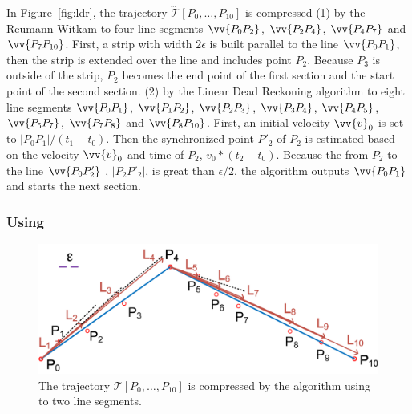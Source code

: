 {\begin{example}
\label{exm-alg-strip}
In Figure~\ref{fig:ldr}, the trajectory $\dddot{\mathcal{T}}[P_0, \ldots, P_{10}]$ is compressed
%
(1) by the Reumann-Witkam to four line segments $\vv{P_0P_2}$, $\vv{P_2P_4}$, $\vv{P_4P_7}$ and $\vv{P_7P_{10}}$. First, a strip with width $2\epsilon$ is built parallel to the line $\vv{P_0P_1}$, then the strip is extended over the line and includes point $P_2$. Because $P_3$ is outside of the strip, $P_2$ becomes the end point of the first section and the start point of the second section.
%
(2) by the Linear Dead Reckoning algorithm to eight line segments $\vv{P_0P_1}$, $\vv{P_1P_2}$, $\vv{P_2P_3}$, $\vv{P_3P_4}$, $\vv{P_4P_5}$, $\vv{P_5P_7}$, $\vv{P_7P_8}$ and $\vv{P_8P_{10}}$. First, an initial velocity ${\vv{v}_0}$ is set to $|P_0P_1|/(t_1-t_0)$. Then the synchronized point $P'_2$ of $P_2$ is estimated based on the velocity ${\vv{v}_0}$ and time of $P_2$, \ie ${v}_0 * (t_2-t_0)$. Because the \sed from $P_2$ to the line $\vv{P_0P'_2}$ , \ie $|P_2P'_2|$, is great than $\epsilon/2$, the algorithm outputs $\vv{P_0P_1}$ and starts the next section.
\end{example}

}%

\subsubsection{\operb Using \ped}
\label{sec-operb}


\begin{figure}[tb!]
	\centering
	\includegraphics[scale=0.66]{figures/Fig-oper.png}
	\vspace{-1ex}
	\caption{\small The trajectory $\dddot{\mathcal{T}}[P_0, \ldots, P_{10}]$ is compressed by the \operb algorithm using \ped to two line segments.}
	\vspace{-2ex}
	\label{fig:operb}
\end{figure}


